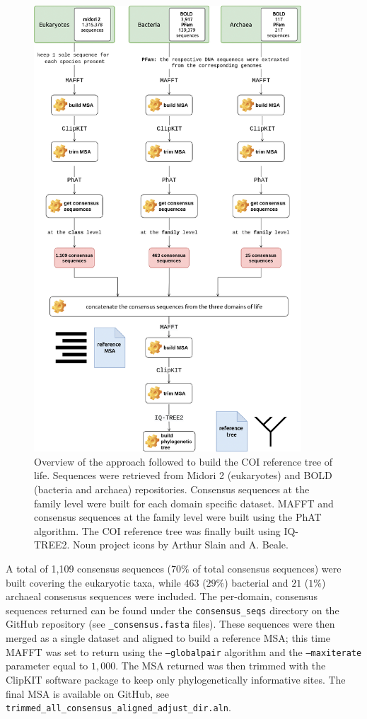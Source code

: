    \begin{figure}
      \centering
      \includegraphics[width=100mm]{figures/darn_methodology.jpg}
      \caption[Building the COI reference tree of life]{
         Overview of the approach followed to build the COI reference tree of life. 
         Sequences were retrieved from Midori 2 (eukaryotes) and BOLD (bacteria and archaea) repositories. 
         Consensus sequences at the family level were built for each domain specific dataset. 
         MAFFT and consensus sequences at the family level were built using the PhAT algorithm. 
         The COI reference tree was finally built using IQ-TREE2. 
         Noun project icons by Arthur Slain and A. Beale.
      }
      \label{fig:darn-build-tree}
   \end{figure}


   A total of 1,109 consensus sequences ($70\%$ of total consensus sequences) were built covering the eukaryotic taxa, 
   while $463$ ($29\%$) bacterial and $21$ ($1\%$) archaeal consensus sequences were included. 
   The per-domain, consensus sequences returned can be found under the \texttt{consensus\_seqs} directory on 
   the GitHub repository 
   (see \texttt{\_consensus.fasta} files). 
   These sequences were then merged as a single dataset and aligned to build a reference MSA; 
   this time MAFFT was set to return using the \texttt{--globalpair} algorithm and the \texttt{--maxiterate} parameter 
   equal to $1,000$. 
   The MSA returned was then trimmed with the ClipKIT software package \citep{steenwyk2020clipkit} to keep only phylogenetically informative sites. 
   The final MSA is available on GitHub, see \texttt{trimmed\_all\_consensus\_aligned\_adjust\_dir.aln}.

